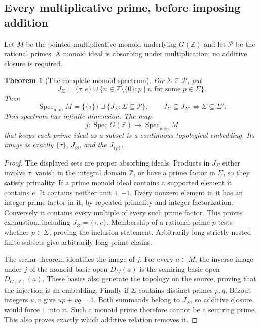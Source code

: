 \documentclass[11pt,a4paper]{article}
\newtheorem{theorem}{Theorem}[section]
\theoremstyle{definition}\newtheorem{definition}[theorem]{Definition}
\newcommand{\Z}{\mathbb Z}\newcommand{\Q}{\mathbb Q}
\newcommand{\Spec}{\operatorname{Spec}}\newcommand{\SpecMon}{\operatorname{Spec}_{\mathrm{mon}}}
\begin{document}
\subsection{Every multiplicative prime, before imposing addition}
Let $M$ be the pointed multiplicative monoid underlying $G(\Z)$ and let $\mathcal P$ be the rational primes. A monoid ideal is absorbing under multiplication; no additive closure is required.
\begin{theorem}[The complete monoid spectrum]\label{thm:rebuilt-monoid}
For $\Sigma\subseteq\mathcal P$, put
\[
 J_\Sigma=\{\tau,e\}\cup\{n\in\Z\setminus\{0\}:p\mid n\text{ for some }p\in\Sigma\}.
\]
Then
\[
 \SpecMon M=\{\{\tau\}\}\sqcup\{J_\Sigma:\Sigma\subseteq\mathcal P\},
 \qquad J_\Sigma\subseteq J_{\Sigma'}\iff\Sigma\subseteq\Sigma'.
\]
This spectrum has infinite dimension. The map
\begin{equation}\label{eq:semiring-monoid-inclusion}
 j:\Spec G(\Z)\longrightarrow\SpecMon M
\end{equation}
that keeps each prime ideal as a subset is a continuous topological embedding. Its image is exactly $\{\tau\}$, $J_\varnothing$, and the $J_{\{p\}}$.
\end{theorem}
\begin{proof}
The displayed sets are proper absorbing ideals. Products in $J_\Sigma$ either involve $\tau$, vanish in the integral domain $\Z$, or have a prime factor in $\Sigma$, so they satisfy primality. If a prime monoid ideal contains a supported element it contains $e$. It contains neither unit $1,-1$. Every nonzero element in it has an integer prime factor in it, by repeated primality and integer factorization. Conversely it contains every multiple of every such prime factor. This proves exhaustion, including $J_\varnothing=\{\tau,e\}$. Membership of a rational prime $p$ tests whether $p\in\Sigma$, proving the inclusion statement. Arbitrarily long strictly nested finite subsets give arbitrarily long prime chains.

The scalar theorem identifies the image of $j$. For every $a\in M$, the inverse image under $j$ of the monoid basic open $D_M(a)$ is the semiring basic open $D_{G(\Z)}(a)$. These basics also generate the topology on the source, proving that the injection is an embedding. Finally if $\Sigma$ contains distinct primes $p,q$, B\'ezout integers $u,v$ give $up+vq=1$. Both summands belong to $J_\Sigma$, so additive closure would force $1$ into it. Such a monoid prime therefore cannot be a semiring prime. This also proves exactly which additive relation removes it.
\end{proof}
\end{document}

